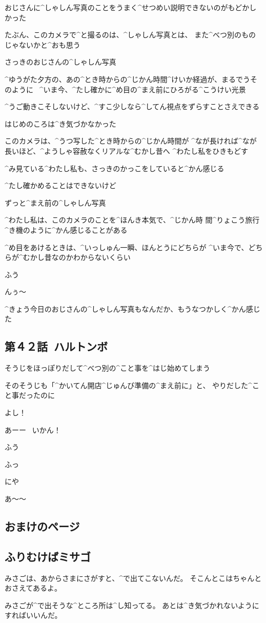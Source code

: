 \page[138]
\Alpha おじさんに^{しゃしん}{写真}のことをうまく^{せつめい}{説明}できないのがもどかしかった

\Alpha たぶん、このカメラで^{と}{撮}るのは、^{しゃしん}{写真}とは、
また^{べつ}{別}のものじゃないかと^{おも}{思}う

\page
\Alpha さっきのおじさんの^{しゃしん}{写真}

\page
\Alpha ^{ゆうがた}{夕方}の、あの^{とき}{時}からの^{じかん}{時間}^{けいか}{経過}が、まるでうそのように
\ ^{いま}{今}、^{たし}{確}かに^{め}{目}の^{まえ}{前}にひろがる^{こうけい}{光景}

\Alpha ^{うご}{動}きこそしないけど、^{すこ}{少}しなら^{してん}{視点}をずらすことさえできる

\page
\Alpha はじめのころは^{き}{気}づかなかった

\Alpha このカメラは、^{うつ}{写}した^{とき}{時}からの^{じかん}{時間}が
^{なが}{長}ければ^{なが}{長}いほど、^{ようしゃ}{容赦}なくリアルな^{むかし}{昔}へ
^{わたし}{私}をひきもどす

\Alpha ^{み}{見}ている^{わたし}{私}も、さっきのかっこをしていると^{かん}{感}じる

\Alpha ^{たし}{確}かめることはできないけど

\Alpha ずっと^{まえ}{前}の^{しゃしん}{写真}

\page[143]
\Alpha ^{わたし}{私}は、このカメラのことを^{ほんき}{本気}で、^{じかん}{時
  間}^{りょこう}{旅行}^{き}{機}のように^{かん}{感}じることがある

\page
\Alpha ^{め}{目}をあけるときは、^{いっしゅん}{一瞬}、ほんとうにどちらが
^{いま}{今}で、どちらが^{むかし}{昔}なのかわからないくらい

\page
\Alpha ふう

\Alpha んぅ〜

\page
\Alpha ^{きょう}{今日}のおじさんの^{しゃしん}{写真}もなんだか、もうなつかしく^{かん}{感}じた


\subsection{第４２話\ ハルトンボ}

\page[148]
\Alpha そうじをほっぽりだして^{べつ}{別}の^{こと}{事}を^{はじ}{始}めてしまう

\page
\Alpha そのそうじも「^{かいてん}{開店}^{じゅんび}{準備}の^{まえ}{前}に」と、
やりだした^{こと}{事}だったのに

\page[154]
\Alpha よし！

\Alpha あーー
\ いかん！

\page[156]
\Alpha ふう

\page[158]
\Alpha ふっ

\Alpha にや

\page[160]
\Alpha あ〜〜


\subsection{おまけのページ}


\subsection{ふりむけばミサゴ}
\Takahiro みさごは、あからさまにさがすと、^{で}{出}てこないんだ。
そこんとこはちゃんとおさえてあるよ。

\Takahiro みさごが^{で}{出}そうな^{ところ}{所}は^{し}{知}ってる。
あとは^{き}{気}づかれないようにすればいいんだ。
